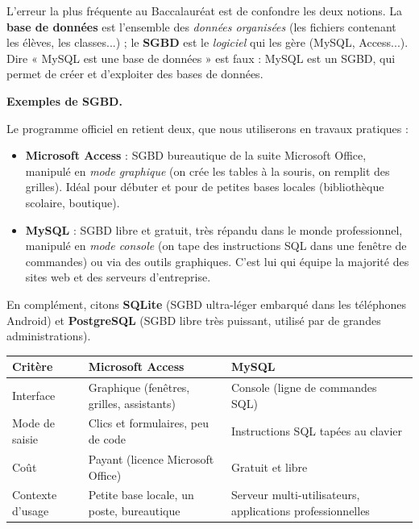\documentclass[11pt]{article}
\begin{document}
\begin{attention}
L'erreur la plus fréquente au Baccalauréat est de confondre les deux notions. La \textbf{base de données} est l'ensemble des \emph{données organisées} (les fichiers contenant les élèves, les classes...) ; le \textbf{SGBD} est le \emph{logiciel} qui les gère (MySQL, Access...). Dire « MySQL est une base de données » est faux : MySQL est un SGBD, qui permet de créer et d'exploiter des bases de données.
\end{attention}

\textbf{Exemples de SGBD.}\par
Le programme officiel en retient deux, que nous utiliserons en travaux pratiques :

\begin{itemize}
\item \textbf{Microsoft Access} : SGBD bureautique de la suite Microsoft Office, manipulé en \emph{mode graphique} (on crée les tables à la souris, on remplit des grilles). Idéal pour débuter et pour de petites bases locales (bibliothèque scolaire, boutique).
\item \textbf{MySQL} : SGBD libre et gratuit, très répandu dans le monde professionnel, manipulé en \emph{mode console} (on tape des instructions SQL dans une fenêtre de commandes) ou via des outils graphiques. C'est lui qui équipe la majorité des sites web et des serveurs d'entreprise.
\end{itemize}

En complément, citons \textbf{SQLite} (SGBD ultra-léger embarqué dans les téléphones Android) et \textbf{PostgreSQL} (SGBD libre très puissant, utilisé par de grandes administrations).

\begin{center}
\begin{tabularx}{\linewidth}{|l|X|X|}
\hline
\rowcolor{popblueL} \textbf{Critère} & \textbf{Microsoft Access} & \textbf{MySQL} \\
\hline
Interface & Graphique (fenêtres, grilles, assistants) & Console (ligne de commandes SQL) \\
\hline
Mode de saisie & Clics et formulaires, peu de code & Instructions SQL tapées au clavier \\
\hline
Coût & Payant (licence Microsoft Office) & Gratuit et libre \\
\hline
Contexte d'usage & Petite base locale, un poste, bureautique & Serveur multi-utilisateurs, applications professionnelles \\
\hline
\end{tabularx}
\end{center}
\end{document}
